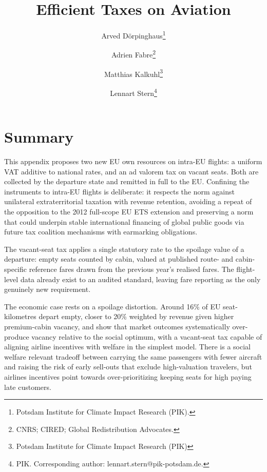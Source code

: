 \documentclass[../../main]{subfiles}
\begin{document}
\title{Efficient Taxes on Aviation} %
\author{Arved Dörpinghaus\thanks{Potsdam Institute for Climate Impact Research (PIK).}\and Adrien Fabre\thanks{CNRS; CIRED; Global Redistribution Advocates.}\and Matthias Kalkuhl\thanks{Potsdam Institute for Climate Impact Research (PIK)}\and Lennart Stern\thanks{PIK. Corresponding author: lennart.stern@pik-potsdam.de.}}


\maketitle
\section{Summary}
This appendix proposes two new EU own resources on intra-EU flights: a uniform VAT additive to national rates, and an ad valorem tax on vacant seats. Both are collected by the departure state and remitted in full to the EU. Confining the instruments to intra-EU flights is deliberate: it respects the norm against unilateral extraterritorial taxation with revenue retention, avoiding a repeat of the opposition to the 2012 full-scope EU ETS extension and preserving a norm that could underpin stable international financing of global public goods via future tax coalition mechanisms with earmarking obligations.

The vacant-seat tax applies a single statutory rate to the spoilage value of a departure: empty seats counted by cabin, valued at published route- and cabin-specific reference fares drawn from the previous year's realised fares. The flight-level data already exist to an audited standard, leaving fare reporting as the only genuinely new requirement.

The economic case rests on a spoilage distortion. Around 16\% of EU seat-kilometres depart empty, closer to 20\% weighted by revenue given higher premium-cabin vacancy, and \citet{Dörpinghaus_et_al_2026} show that market outcomes systematically over-produce vacancy relative to the social optimum, with a vacant-seat tax capable of aligning airline incentives with welfare in the simplest model. There is a social welfare relevant tradeoff between carrying the same passengers with fewer aircraft and raising the risk of early sell-outs that exclude high-valuation travelers, but airlines incentives point towards over-prioritizing keeping seats for high paying late customers.
\end{document}
